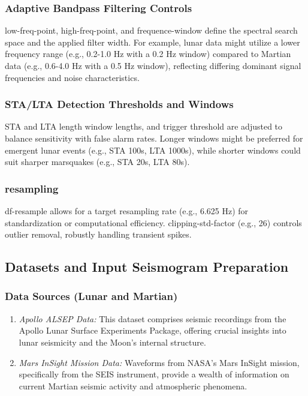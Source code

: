 \documentclass[conference]{IEEEtran}
\begin{document}
            \subsubsection{Adaptive Bandpass Filtering Controls}
                low-freq-point, high-freq-point, and frequence-window define the spectral search space and the applied
                filter width. For example, lunar data might utilize a lower frequency range (e.g., 0.2-1.0 Hz with a 0.2 Hz
                window) compared to Martian data (e.g., 0.6-4.0 Hz with a 0.5 Hz window), reflecting differing dominant
                signal frequencies and noise characteristics.
            \subsubsection{STA/LTA Detection Thresholds and Windows}
                STA and LTA length window lengths, and trigger threshold are adjusted to balance sensitivity with false
                alarm rates. Longer windows might be preferred for emergent lunar events (e.g., STA 100s, LTA 1000s), while
                shorter windows could suit sharper marsquakes (e.g., STA 20s, LTA 80s).
            \subsubsection{resampling}
                df-resample allows for a target resampling rate (e.g., 6.625 Hz) for standardization or computational efficiency.
                clipping-std-factor (e.g., 26) controls outlier removal, robustly handling transient spikes.
        
        \subsection{Datasets and Input Seismogram Preparation}
            \subsubsection{Data Sources (Lunar and Martian)}
                \begin{enumerate}[label=\alph*), leftmargin=3em]
                    \item \textit{Apollo ALSEP Data:} This dataset comprises seismic recordings from the Apollo Lunar
                    Surface Experiments Package, offering crucial insights into lunar seismicity and the Moon's internal
                    structure.
                    \item \textit{Mars InSight Mission Data:} Waveforms from NASA's Mars InSight mission, specifically from
                    the SEIS instrument, provide a wealth of information on current Martian seismic activity and atmospheric
                    phenomena.
                \end{enumerate}
\end{document}

